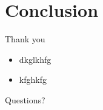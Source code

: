 \documentclass[notes, xcolor=dvipsnames]{beamer}
\begin{document}
    \section{Conclusion}

    \begin{frame}{Thank you}

        \begin{itemize}
            \item dkglkhfg
            \item kfghkfg
        \end{itemize}

        Questions? 

    \end{frame}

    \begin{frame}
        
    \end{frame}
\end{document}
